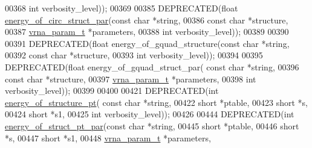 \begin{DoxyCode}
00368                                 \textcolor{keywordtype}{int} verbosity\_level));
00369 
00385 DEPRECATED(\textcolor{keywordtype}{float} \hyperlink{group__eval_ga3f01f9744ba6a40555eb4d81fc77f6df}{energy\_of\_circ\_struct\_par}(\textcolor{keyword}{const} \textcolor{keywordtype}{char} *\textcolor{keywordtype}{string},
00386                                 \textcolor{keyword}{const} \textcolor{keywordtype}{char} *structure,
00387                                 \hyperlink{group__energy__parameters_structvrna__param__s}{vrna\_param\_t} *parameters,
00388                                 \textcolor{keywordtype}{int} verbosity\_level));
00389 
00390 
00391 DEPRECATED(\textcolor{keywordtype}{float} energy\_of\_gquad\_structure(\textcolor{keyword}{const} \textcolor{keywordtype}{char} *\textcolor{keywordtype}{string},
00392                                 \textcolor{keyword}{const} \textcolor{keywordtype}{char} *structure,
00393                                 \textcolor{keywordtype}{int} verbosity\_level));
00394 
00395 DEPRECATED(\textcolor{keywordtype}{float} energy\_of\_gquad\_struct\_par( \textcolor{keyword}{const} \textcolor{keywordtype}{char} *\textcolor{keywordtype}{string},
00396                                   \textcolor{keyword}{const} \textcolor{keywordtype}{char} *structure,
00397                                   \hyperlink{group__energy__parameters_structvrna__param__s}{vrna\_param\_t} *parameters,
00398                                   \textcolor{keywordtype}{int} verbosity\_level));
00399 
00400 
00421 DEPRECATED(\textcolor{keywordtype}{int} \hyperlink{group__eval_ga8831445966b761417e713360791299d8}{energy\_of\_structure\_pt}( \textcolor{keyword}{const} \textcolor{keywordtype}{char} *\textcolor{keywordtype}{string},
00422                             \textcolor{keywordtype}{short} *ptable,
00423                             \textcolor{keywordtype}{short} *s,
00424                             \textcolor{keywordtype}{short} *s1,
00425                             \textcolor{keywordtype}{int} verbosity\_level));
00426 
00444 DEPRECATED(\textcolor{keywordtype}{int} \hyperlink{group__eval_ga49acb3d5627dc6823a7ce12d116d4c69}{energy\_of\_struct\_pt\_par}(\textcolor{keyword}{const} \textcolor{keywordtype}{char} *\textcolor{keywordtype}{string},
00445                             \textcolor{keywordtype}{short} *ptable,
00446                             \textcolor{keywordtype}{short} *s,
00447                             \textcolor{keywordtype}{short} *s1,
00448                             \hyperlink{group__energy__parameters_structvrna__param__s}{vrna\_param\_t} *parameters,

\end{DoxyCode}
